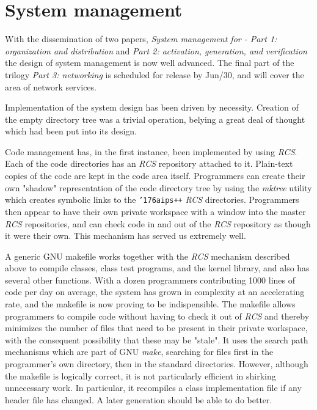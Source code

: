 \def\~{{\char'176}}

\chapter{System management}
\bigskip

   With the dissemination of two papers, {\it System management for \aipspp -
Part 1: organization and distribution} and {\it Part 2: activation,
generation, and verification} the design of \aipspp system management is now
well advanced.  The final part of the trilogy {\it Part 3: networking} is
scheduled for release by Jun/30, and will cover the area of network services.

   Implementation of the system design has been driven by necessity.  Creation
of the empty \aipspp directory tree was a trivial operation, belying a great
deal of thought which had been put into its design.

   Code management has, in the first instance, been implemented by using
{\it RCS}.  Each of the code directories has an {\it RCS} repository attached
to it.  Plain-text copies of the code are kept in the code area itself.
Programmers can create their own "shadow" representation of the \aipspp code
directory tree by using the {\it mktree} utility which creates symbolic links
to the {\tt \~aips++} {\it RCS} directories.  Programmers then appear to have
their own private workspace with a window into the master {\it RCS}
repositories, and can check code in and out of the {\it RCS} repository as
though it were their own.  This mechanism has served us extremely well.

   A generic GNU makefile works together with the {\it RCS} mechanism
described above to compile classes, class test programs, and the kernel
library, and also has several other functions.  With a dozen programmers
contributing 1000 lines of code per day on average, the system has grown in
complexity at an accelerating rate, and the makefile is now proving to be
indispensible.  The makefile allows programmers to compile code without
having to check it out of {\it RCS} and thereby minimizes the number of files
that need to be present in their private workspace, with the consequent
possibility that these may be "stale".  It uses the search path mechanisms
which are part of GNU {\it make}, searching for files first in the
programmer's own directory, then in the standard \aipspp directories.
However, although the makefile is logically correct, it is not particularly
efficient in shirking unnecessary work.  In particular, it recompiles a class
implementation file if any header file has changed.  A later generation should
be able to do better.

